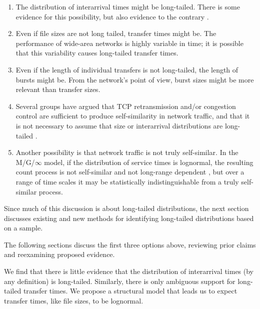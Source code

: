 \documentclass[twocolumn,11pt]{infocom}
\begin{document}
\begin{enumerate} 

\item The distribution of interarrival times might be long-tailed.
There is some evidence for this possibility, but also evidence to the
contrary \cite{PaxsonFloyd95} \cite{ArlittWilliamson96}
\cite{BarfordCrovella98} \cite{FeldmannGilbertWillingerKurtz98}.

\item Even if file sizes are not long tailed, transfer times might be.
The performance of wide-area networks is highly variable in time; it
is possible that this variability causes long-tailed transfer times.

\item Even if the length of individual transfers is not long-tailed, the
length of bursts might be.  From the network's point of view,
burst sizes might be more relevant than transfer sizes.

\item Several groups have argued that TCP
retransmission and/or congestion control are sufficient to
produce self-similarity in
network traffic, and that it is not necessary to assume
that size or interarrival distributions are long-tailed
\cite{Peha97}
\cite{VeresBoda00} \cite{FengTinnakornsrisuphap00}
\cite{GuoCrovellaMatta01}.

\item Another possibility is that network traffic is not truly
self-similar.  In the M/G/$\infty$ model, if the distribution of
service times is lognormal, the resulting count process is not
self-similar and not long-range dependent \cite{PaxsonFloyd95}, but
over a range of time scales it may be statistically
indistinguishable from a truly self-similar process.

\end{enumerate}

Since much of this discussion is about long-tailed distributions, the
next section discusses existing and new methods for identifying
long-tailed distributions based on a sample.

The following sections discuss the first three options above,
reviewing prior claims and reexamining proposed evidence.

We find that there is little evidence that the distribution of
interarrival times (by any definition) is long-tailed.  Similarly,
there is only ambiguous support for long-tailed transfer times.
We propose a structural model that leads us to expect transfer times,
like file sizes, to be lognormal.
\end{document}
